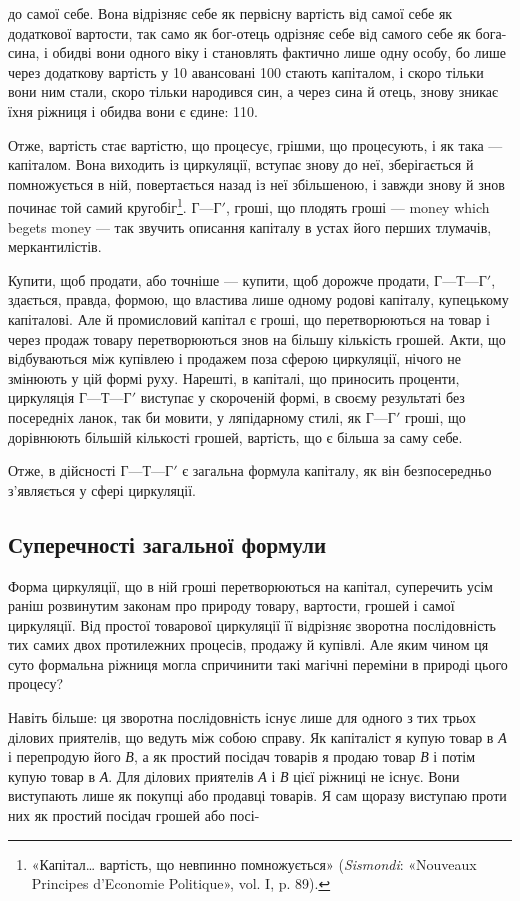 \parcont{}  %
до самої себе. Вона відрізняє себе як первісну вартість від самої
себе як додаткової вартости, так само як бог-отець одрізняє
себе від самого себе як бога-сина, і обидві вони одного віку
і становлять фактично лише одну особу, бо лише через додаткову
вартість у 10 авансовані 100
стають капіталом, і скоро тільки вони ним стали, скоро тільки
народився син, а через сина й отець, знову зникає їхня ріжниця
і обидва вони є єдине: 110.

Отже, вартість стає вартістю, що процесує, грішми, що процесують,
і як така — капіталом. Вона виходить із циркуляції,
вступає знову до неї, зберігається й помножується в ній, повертається
назад із неї збільшеною, і завжди знову й знов починає той
самий кругобіг\footnote{
«Капітал\dots{} вартість, що невпинно помножується» (\emph{Sismondi}: «Nouveaux
Principes d’Economie Politique», vol. I, p. 89).
}. $Г — Г'$, гроші, що плодять гроші — money which
begets money — так звучить описання капіталу в устах його
перших тлумачів, меркантилістів.

Купити, щоб продати, або точніше — купити, щоб дорожче
продати, $Г — Т — Г'$, здається, правда, формою, що властива
лише одному родові капіталу, купецькому капіталові. Але й
промисловий капітал є гроші, що перетворюються на товар і
через продаж товару перетворюються знов на більшу кількість
грошей. Акти, що відбуваються між купівлею і продажем поза
сферою циркуляції, нічого не змінюють у цій формі руху. Нарешті,
в капіталі, що приносить проценти, циркуляція $Г — Т — Г'$
виступає у скороченій формі, в своєму результаті без посередніх
ланок, так би мовити, у ляпідарному стилі, як $Г — Г'$ гроші, що
дорівнюють більшій кількості грошей, вартість, що є більша за
саму себе.

Отже, в дійсності $Г — Т — Г'$ є загальна формула капіталу,
як він безпосередньо з’являється у сфері циркуляції.

\subsection{Суперечності загальної формули}

Форма циркуляції, що в ній гроші перетворюються на капітал,
суперечить усім раніш розвинутим законам про природу товару,
вартости, грошей і самої циркуляції. Від простої товарової
циркуляції її відрізняє зворотна послідовність тих самих двох
протилежних процесів, продажу й купівлі. Але яким чином
ця суто формальна ріжниця могла спричинити такі магічні переміни
в природі цього процесу?

Навіть більше: ця зворотна послідовність існує лише для
одного з тих трьох ділових приятелів, що ведуть між собою
справу. Як капіталіст я купую товар в \emph{А} і перепродую його \emph{В},
а як простий посідач товарів я продаю товар \emph{В} і потім купую
товар в \emph{А}. Для ділових приятелів \emph{А} і \emph{В} цієї ріжниці не існує.
Вони виступають лише як покупці або продавці товарів. Я сам
щоразу виступаю проти них як простий посідач грошей або посі-
\parbreak{}  %

